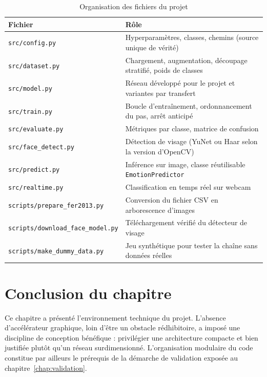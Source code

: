 \documentclass[a4paper,12pt]{report}
\begin{document}
\begin{table}[htbp]
\centering
\caption{Organisation des fichiers du projet}
\begin{tabular}{|l|p{8.5cm}|}
\hline
\textbf{Fichier} & \textbf{Rôle} \\
\hline
\texttt{src/config.py} & Hyperparamètres, classes, chemins (source unique de vérité) \\
\texttt{src/dataset.py} & Chargement, augmentation, découpage stratifié, poids de classes \\
\texttt{src/model.py} & Réseau développé pour le projet et variantes par transfert \\
\texttt{src/train.py} & Boucle d'entraînement, ordonnancement du pas, arrêt anticipé \\
\texttt{src/evaluate.py} & Métriques par classe, matrice de confusion \\
\texttt{src/face\_detect.py} & Détection de visage (YuNet ou Haar selon la version d'OpenCV) \\
\texttt{src/predict.py} & Inférence sur image, classe réutilisable \texttt{EmotionPredictor} \\
\texttt{src/realtime.py} & Classification en temps réel sur webcam \\
\hline
\texttt{scripts/prepare\_fer2013.py} & Conversion du fichier CSV en arborescence d'images \\
\texttt{scripts/download\_face\_model.py} & Téléchargement vérifié du détecteur de visage \\
\texttt{scripts/make\_dummy\_data.py} & Jeu synthétique pour tester la chaîne sans données réelles \\
\hline
\end{tabular}
\end{table}

\section*{Conclusion du chapitre}
Ce chapitre a présenté l'environnement technique du projet. L'absence
d'accélérateur graphique, loin d'être un obstacle rédhibitoire, a imposé une
discipline de conception bénéfique : privilégier une architecture compacte et
bien justifiée plutôt qu'un réseau surdimensionné. L'organisation modulaire du
code constitue par ailleurs le prérequis de la démarche de validation exposée
au chapitre~\ref{chap:validation}.

\end{document}
